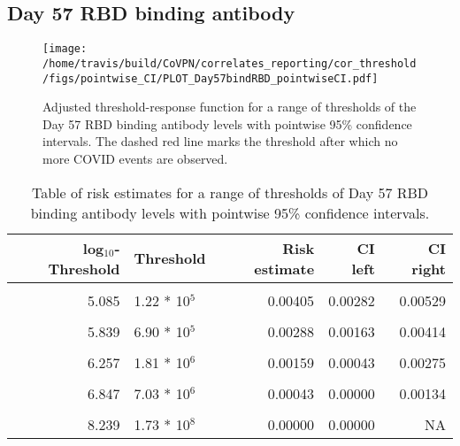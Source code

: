 \documentclass[]{book}
\theoremstyle{definition}
\theoremstyle{definition}
\theoremstyle{definition}
\newcommand{\1}{\mathbbm{1}}
\begin{document}
\clearpage

\clearpage

\clearpage

\hypertarget{day-57-rbd-binding-antibody}{%
\subsection{Day 57 RBD binding antibody}\label{day-57-rbd-binding-antibody}}

\begin{figure}[H]
\centering
\texttt{[image: /home/travis/build/CoVPN/correlates\_reporting/cor\_threshold/figs/pointwise\_CI/PLOT\_Day57bindRBD\_pointwiseCI.pdf]}
\caption{Adjusted threshold-response function for a range of thresholds of the
  Day 57 RBD binding antibody levels with pointwise 95\% confidence intervals. The dashed red line marks the threshold after which no more COVID events are observed. }
\end{figure}
\begin{table}[!h]

\caption{\label{tab:unnamed-chunk-349}Table of risk estimates for a range of thresholds of Day 57 RBD binding antibody levels with pointwise 95\% confidence intervals.}
\centering
\begin{tabular}[t]{rlrrr}
\toprule
log$_{10}$-Threshold & Threshold & Risk estimate & CI left & CI right\\
\midrule
\cellcolor{gray!6}{4.062} & \cellcolor{gray!6}{1.15 * 10$^4$} & \cellcolor{gray!6}{0.00490} & \cellcolor{gray!6}{0.00360} & \cellcolor{gray!6}{0.00619}\\
5.085 & 1.22 * 10$^5$ & 0.00405 & 0.00282 & 0.00529\\
\cellcolor{gray!6}{5.507} & \cellcolor{gray!6}{3.21 * 10$^5$} & \cellcolor{gray!6}{0.00377} & \cellcolor{gray!6}{0.00247} & \cellcolor{gray!6}{0.00507}\\
5.839 & 6.90 * 10$^5$ & 0.00288 & 0.00163 & 0.00414\\
\cellcolor{gray!6}{6.048} & \cellcolor{gray!6}{1.12 * 10$^6$} & \cellcolor{gray!6}{0.00238} & \cellcolor{gray!6}{0.00113} & \cellcolor{gray!6}{0.00364}\\
6.257 & 1.81 * 10$^6$ & 0.00159 & 0.00043 & 0.00275\\
\cellcolor{gray!6}{6.499} & \cellcolor{gray!6}{3.16 * 10$^6$} & \cellcolor{gray!6}{0.00131} & \cellcolor{gray!6}{0.00007} & \cellcolor{gray!6}{0.00255}\\
6.847 & 7.03 * 10$^6$ & 0.00043 & 0.00000 & 0.00134\\
\cellcolor{gray!6}{7.181} & \cellcolor{gray!6}{1.52 * 10$^7$} & \cellcolor{gray!6}{0.00087} & \cellcolor{gray!6}{0.00000} & \cellcolor{gray!6}{0.00279}\\
8.239 & 1.73 * 10$^8$ & 0.00000 & 0.00000 & NA\\
\bottomrule
\end{tabular}
\end{table}
\end{document}
